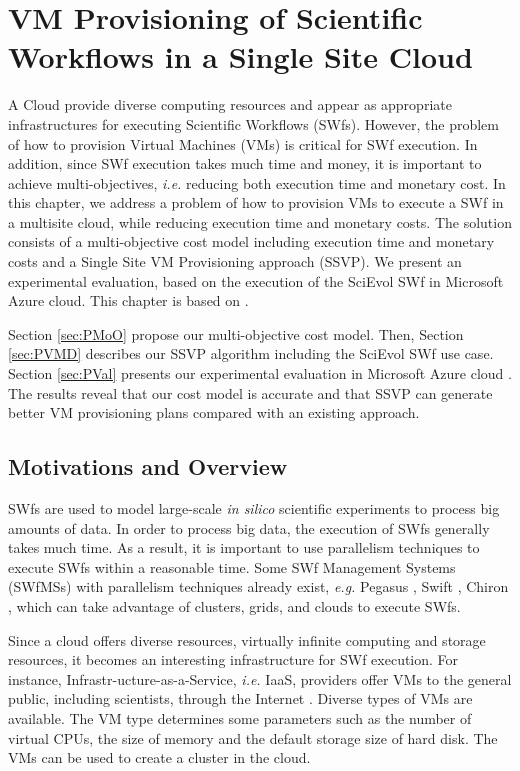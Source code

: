\chapter{VM Provisioning of Scientific Workflows in a Single Site Cloud} \label{MOVMPSWC}

A Cloud provide diverse computing resources and appear as appropriate infrastructures for executing Scientific Workflows (SWfs).
However, the problem of how to provision Virtual Machines (VMs) is critical for SWf execution.
In addition, since SWf execution takes much time and money, it is important to achieve multi-objectives, \textit{i.e.} reducing both execution time and monetary cost.
In this chapter, we address a problem of how to provision VMs to execute a SWf in a multisite cloud, while reducing execution time and monetary costs.
The solution consists of a multi-objective cost model including execution time and monetary costs and a Single Site VM Provisioning approach (SSVP).
We present an experimental evaluation, based on the execution of the SciEvol SWf in Microsoft Azure cloud. This chapter is based on \cite{Liu16}.

Section \ref{sec:PMoO} propose our multi-objective cost model. 
Then, Section \ref{sec:PVMD} describes our SSVP algorithm including the SciEvol SWf use case.
Section \ref{sec:PVal} presents our experimental evaluation in Microsoft Azure cloud \cite{Azure}.
The results reveal that our cost model is accurate and that SSVP can generate better VM provisioning plans compared with an existing approach.

\section{Motivations and Overview}

SWfs are used to model large-scale \textit{in silico} scientific experiments to process big amounts of data. In order to process big data, the execution of SWfs generally takes much time. As a result, it is important to use parallelism techniques to execute SWfs within a reasonable time. Some SWf Management Systems (SWfMSs) with parallelism techniques already exist, \textit{e.g.} Pegasus \cite{Deelman2005,Deelman2014}, Swift \cite{Zhao2007}, Chiron \cite{Ogasawara2013}, which can take advantage of clusters, grids, and clouds to execute SWfs.

Since a cloud offers diverse resources, virtually infinite computing and storage resources, it becomes an interesting infrastructure for SWf execution. 
For instance, Infrastr-ucture-as-a-Service, \textit{i.e.} IaaS, providers offer VMs to the general public, including scientists, through the Internet \cite{Gonzalez09}.
Diverse types of VMs are available.  The VM type determines some parameters such as the number of virtual CPUs, the size of memory and the default storage size of hard disk.
The VMs can be used to create a cluster in the cloud. 

